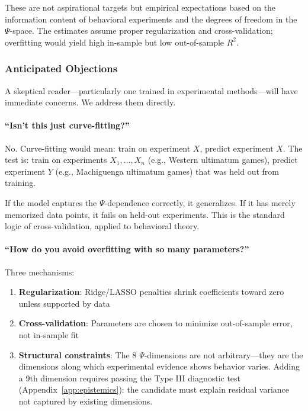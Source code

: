 These are not aspirational targets but empirical expectations based on the
information content of behavioral experiments and the degrees of freedom in
the $\Psi$-space. The estimates assume proper regularization and
cross-validation; overfitting would yield high in-sample but low
out-of-sample $R^2$.


\subsubsection{Anticipated Objections}

A skeptical reader---particularly one trained in experimental methods---will
have immediate concerns. We address them directly.

\paragraph{``Isn't this just curve-fitting?''}
No. Curve-fitting would mean: train on experiment $X$, predict experiment $X$.
The test is: train on experiments $X_1, \ldots, X_n$ (e.g., Western ultimatum
games), predict experiment $Y$ (e.g., Machiguenga ultimatum games) that was
held out from training.

If the model captures the $\Psi$-dependence correctly, it generalizes. If it
has merely memorized data points, it fails on held-out experiments. This is
the standard logic of cross-validation, applied to behavioral theory.

\paragraph{``How do you avoid overfitting with so many parameters?''}
Three mechanisms:
\begin{enumerate}
    \item \textbf{Regularization}: Ridge/LASSO penalties shrink coefficients
          toward zero unless supported by data
    \item \textbf{Cross-validation}: Parameters are chosen to minimize
          out-of-sample error, not in-sample fit
    \item \textbf{Structural constraints}: The 8 $\Psi$-dimensions are not
          arbitrary---they are the dimensions along which experimental
          evidence shows behavior varies. Adding a 9th dimension requires
          passing the Type III diagnostic test (Appendix~\ref{app:epistemics}):
          the candidate must explain residual variance not captured by existing
          dimensions.
\end{enumerate}

